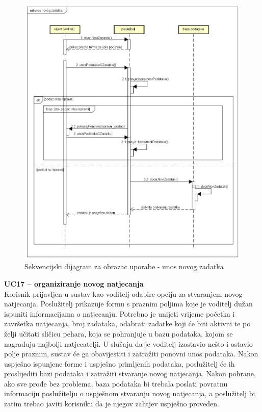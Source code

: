 				\begin{figure}[H]
					\includegraphics[scale=0.6]{dijagrami/sd15.png} 
					\centering
					\caption{Sekvencijski dijagram za obrazac uporabe - unos novog zadatka}
					\label{fig:sekvencijski1}
				\end{figure}
				\pagebreak
				
				\noindent \textbf{UC17 – organiziranje novog natjecanja}\\
				
				\noindent Korisnik prijavljen u sustav kao voditelj odabire opciju za stvaranjem novog natjecanja. Poslužitelj prikazuje formu s praznim poljima koje je voditelj dužan ispuniti informacijama o natjecanju. Potrebno je unijeti vrijeme početka i završetka natjecanja, broj zadataka, odabrati zadatke koji će biti aktivni te po želji učitati sličicu pehara, koja se pohranjuje u bazu podataka, kojom se nagrađuju najbolji natjecatelji. U slučaju da je voditelj izostavio nešto i ostavio polje praznim, sustav će ga obavijestiti i zatražiti ponovni unos podataka. Nakon uspješno ispunjene forme i uspješno primljenih podataka, poslužitelj će ih proslijediti bazi podataka i zatražiti stvaranje novog natjecanja. Nakon pohrane, ako sve prođe bez problema, baza podataka bi trebala poslati povratnu informaciju poslužitelju o uspješnom stvaranju novog natjecanja, a poslužitelj bi zatim trebao javiti korisniku da je njegov zahtjev uspješno proveden.
				
